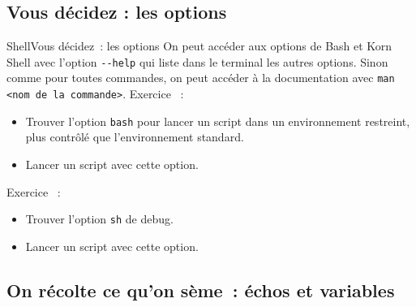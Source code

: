 \documentclass{beamer}
\begin{document}
    \subsection{Vous décidez : les options}\label{subsec:shell-options}

    \begin{frame}[fragile]{Shell}{Vous décidez~: les options}
        On peut accéder aux options de Bash et Korn Shell avec l'option \lstinline{--help} qui liste dans le terminal les autres options.
        \bigbreak
        Sinon comme pour toutes commandes, on peut accéder à la documentation avec \lstinline{man <nom de la commande>}.
        \bigbreak
        Exercice \execcounterdispinc~:
        \begin{itemize}
            \item Trouver l'option \lstinline{bash} pour lancer un script dans un environnement restreint, plus contrôlé que l'environnement standard.
            \item Lancer un script avec cette option.
        \end{itemize}
        Exercice \execcounterdispinc~:
        \begin{itemize}
            \item Trouver l'option \lstinline{sh} de debug.
            \item Lancer un script avec cette option.
        \end{itemize}
    \end{frame}

    \subsection{On récolte ce qu'on sème~: échos et variables}\label{subsec:recolte}
\end{document}
